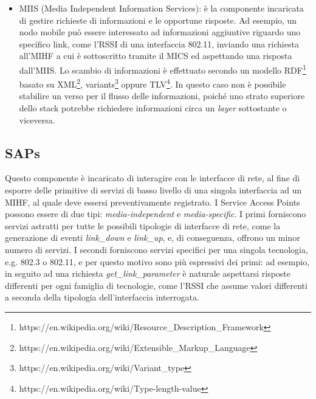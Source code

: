 \begin{itemize}
\item MIIS (Media Independent Information Services): è la componente incaricata di gestire richieste di informazioni e le opportune risposte. Ad esempio, un nodo mobile può essere interessato ad informazioni aggiuntive riguardo uno specifico link, come l'RSSI di una interfaccia 802.11, inviando una richiesta all'MIHF a cui è sottoscritto tramite il MICS ed aspettando una risposta dall'MIIS. Lo scambio di informazioni è effettuato secondo un modello RDF\footnote{https://en.wikipedia.org/wiki/Resource\_Description\_Framework} basato su XML\footnote{https://en.wikipedia.org/wiki/Extensible\_Markup\_Language}, variants\footnote{https://en.wikipedia.org/wiki/Variant\_type} oppure TLV\footnote{https://en.wikipedia.org/wiki/Type-length-value}. In questo caso non è possibile stabilire un verso per il flusso delle informazioni, poiché uno strato superiore dello stack potrebbe richiedere informazioni circa un {\em layer} sottostante o viceversa.
\end{itemize}

\subsection{SAPs}
Questo componente è incaricato di interagire con le interfacce di rete, al fine di esporre delle primitive di servizi di basso livello di una singola interfaccia ad un MIHF, al quale deve essersi preventivamente registrato.
I Service Access Points possono essere di due tipi: {\em media-independent} e {\em media-specific}.
I primi forniscono servizi astratti per tutte le possibili tipologie di interfacce di rete, come la generazione di eventi {\em link\_down} e {\em link\_up}, e, di conseguenza, offrono un minor numero di servizi.
I secondi forniscono servizi specifici per una singola tecnologia, e.g. 802.3 o 802.11, e per questo motivo sono più espressivi dei primi: ad esempio, in seguito ad una richiesta {\em get\_link\_parameter} è naturale aspettarsi risposte differenti per ogni famiglia di tecnologie, come l'RSSI che assume valori differenti a seconda della tipologia dell'interfaccia interrogata. 

